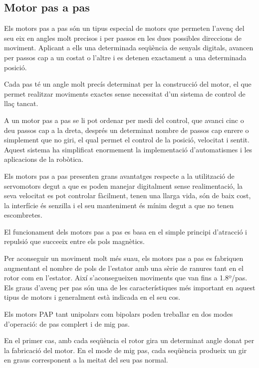 \subsection{Motor pas a pas}
Els motors pas a pas són un tipus especial de motors que permeten l'avenç del seu eix en angles molt precisos i per passos en les dues possibles direccions de moviment. Aplicant a ells una determinada seqüència de senyals digitals, avancen per passos cap a un costat o l'altre i es detenen exactament a una determinada posició.

Cada pas té un angle molt precís determinat per la construcció del motor, el que permet realitzar moviments exactes sense necessitat d'un sistema de control de llaç tancat.

A un motor pas a pas se li pot ordenar per medi del control, que avanci cinc o deu passos cap a la dreta, després un determinat nombre de passos cap enrere o simplement que no giri, el qual permet el control de la posició, velocitat i sentit. Aquest sistema ha simplificat enormement la implementació \newline d'automatismes i les aplicacions de la robòtica.

Els motors pas a pas presenten grans avantatges respecte a la utilització de servomotors degut a que es poden manejar digitalment sense realimentació, la seva velocitat es pot controlar fàcilment, tenen una llarga vida, són de baix cost, la interfície és senzilla i el seu manteniment és mínim degut a que no tenen escombretes.

El funcionament dels motors pas a pas es basa en el simple principi \newline d'atracció i repulsió que succeeix entre els pols magnètics. 

Per aconseguir un moviment molt més suau, els motors pas a pas es fabriquen augmentant el nombre de pols de l'estator amb una sèrie de ranures tant en el rotor com en l'estator. Així s'aconsegueixen moviments que van fins a 1.8º/pas. Els graus d'avenç per pas són una de les característiques més important en aquest tipus de motors i generalment està indicada en el seu cos.

Els motors PAP tant unipolars com bipolars poden treballar en dos modes d'operació: de pas complert i de mig pas.

En el primer cas, amb cada seqüència el rotor gira un determinat angle donat per la fabricació del motor. En el mode de mig pas, cada seqüència produeix un gir en graus corresponent a la meitat del seu pas normal. 



